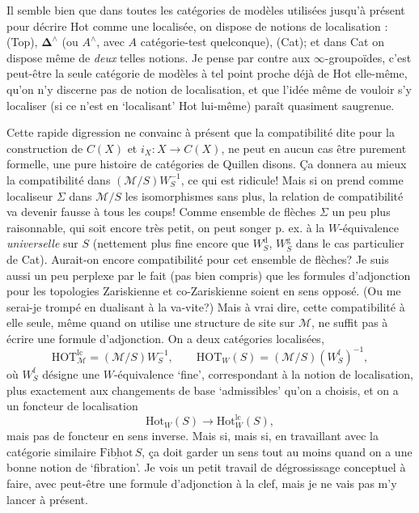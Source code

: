 \documentclass[11pt]{article}
\newcommand{\msp}[1]{\marginpar{\footnotesize [#1]}}
\newcommand{\usl}[1]{\underline{\mathrm{#1}}}
\begin{document}
Il semble bien que dans toutes les catégories de modèles utilisées jusqu’à présent pour décrire Hot comme une localisée, on dispose de notions de localisation : (Top), $\mathbf{\Delta}^\wedge$ (ou $A^\wedge$, avec $A$ catégorie-test quelconque), (Cat); et dans Cat on dispose même de \textit{deux} telles notions. Je pense par contre aux $\infty$-groupoïdes, c’est peut-être la seule catégorie de modèles à tel point proche déjà de Hot elle-même, qu’on n’y discerne pas de notion de localisation, et que l’idée même de vouloir s’y localiser (si ce n’est en ‘localisant’ Hot lui-même) paraît quasiment
\msp{page 84}
saugrenue.

Cette rapide digression ne convainc à présent que la compatibilité dite pour la construction de $C(X)$ et $i_X : X \longrightarrow C(X)$, ne peut en aucun cas être purement formelle, une pure histoire de catégories de Quillen disons. Ça donnera au mieux la compatibilité dans $(\mathcal{M}/S)W_S^{-1}$, ce qui est ridicule! Mais si on prend comme localiseur $\Sigma$ dans $\mathcal{M}/S$ les isomorphismes sans plus, la relation de compatibilité va devenir fausse à tous les coups! Comme ensemble de flèches $\Sigma$ un peu plus raisonnable, qui soit encore très petit, on peut songer p. ex. à la $W$-équivalence \textit{universelle} sur $S$ (nettement plus fine encore que $W_S^{\mathrm{d}}$, $W_S^{\mathrm{g}}$ dans le cas particulier de Cat). Aurait-on encore compatibilité pour cet ensemble de flèches? Je suis aussi un peu perplexe par le fait (pas bien compris) que les formules d’adjonction pour les topologies Zariskienne et co-Zariskienne soient en sens opposé. (Ou me serai-je trompé en dualisant à la va-vite?) Mais à vrai dire, cette compatibilité à elle seule, même quand on utilise une structure de site sur $\mathcal{M}$, ne suffit pas à écrire une formule d’adjonction. On a deux catégories localisées, %
\[
\mathrm{HOT}^{\mathrm{lc}}_{\mathcal{M}} = (\mathcal{M}/S)W_S^{-1}, \qquad \mathrm{HOT}_W(S) = (\mathcal{M}/S)(W_S^{\mathrm{f}})^{-1},
\]
où $W_S^{\mathrm{f}}$ désigne une $W$-équivalence ‘fine’, correspondant à la notion de localisation, plus exactement aux changements de base ‘admissibles’ qu’on a choisis, et on a un foncteur de localisation
\msp{page 85}
\[
\mathrm{Hot}_W(S) \longrightarrow \mathrm{Hot}^{\mathrm{lc}}_{W}(S),
\]
mais pas de foncteur en sens inverse. Mais si, mais si, en travaillant avec la catégorie similaire $\usl{Fibhot}\,S$, ça doit garder un sens tout au moins quand on a une bonne notion de ‘fibration’. Je vois un petit travail de dégrossissage conceptuel à faire, avec peut-être une formule d’adjonction à la clef, mais je ne vais pas m’y lancer à présent.
\end{document}
